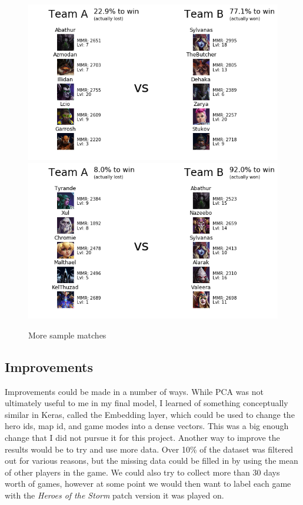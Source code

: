 \documentclass[twoside,twocolumn]{article}
\begin{document}
\begin{figure}
\caption{More sample matches}
\label{figure:match2}
\includegraphics[width=\linewidth]{match3}
\includegraphics[width=\linewidth]{match4}
\centering
\end{figure}


\subsection{Improvements}
Improvements could be made in a number of ways.  While PCA was not ultimately useful to me in my final model, I learned of something conceptually similar in Keras, called the Embedding layer, which could be used to change the hero ids, map id, and game modes into a dense vectors.  This was a big enough change that I did not pursue it for this project.  Another way to improve the results would be to try and use more data.  Over 10\% of the dataset was filtered out for various reasons, but the missing data could be filled in by using the mean of other players in the game.  We could also try to collect more than 30 days worth of games, however at some point we would then want to label each game with the \textit{Heroes of the Storm} patch version it was played on.
\end{document}
